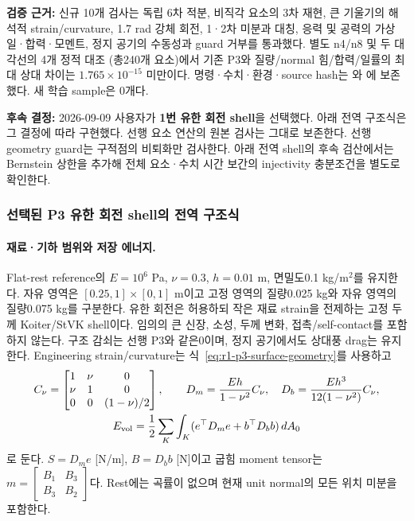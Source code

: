 \documentclass[10pt]{article}
\begin{document}
\textbf{검증 근거:} 신규 10개 검사는 독립 6차 적분, 비직각 요소의 3차 재현,
큰 기울기의 해석적 strain/curvature, 1.7 rad 강체 회전, 1·2차 미분과 대칭,
응력 및 공력의 가상 일·합력·모멘트, 정지 공기의 수동성과 guard 거부를 통과했다.
별도 n4/n8 및 두 대각선의 4개 정적 대조 (총240개 요소)에서 기존 P3와
질량/normal 힘/합력/일률의 최대 상대 차이는 \(1.765\times10^{-15}\) 미만이다.
명령·수치·환경·source hash는
와
에 보존했다. 새 학습 sample은 0개다.

\textbf{후속 결정:} 2026-09-09 사용자가 \textbf{1번 유한 회전 shell}을 선택했다.
아래 전역 구조식은 그 결정에 따라 구현했다. 선행 요소 연산의 원본 검사는 그대로 보존한다.
선행 geometry guard는 구적점의 비퇴화만 검사한다. 아래 전역 shell의 후속 검산에서는
Bernstein 상한을 추가해 전체 요소·수치 시간 보간의 injectivity 충분조건을 별도로 확인한다.

\subsubsection{선택된 P3 유한 회전 shell의 전역 구조식}
\label{sec:r1-p3-shell-equations}

\paragraph{재료·기하 범위와 저장 에너지.}
Flat-rest reference의 \(E=10^6\) Pa, \(\nu=0.3\), \(h=0.01\) m,
면밀도0.1 kg/m$^2$를 유지한다. 자유 영역은 \([0.25,1]\times[0,1]\) m이고
고정 영역의 질량0.025 kg와 자유 영역의 질량0.075 kg를 구분한다.
유한 회전은 허용하되 작은 재료 strain을 전제하는 고정 두께 Koiter/StVK shell이다.
임의의 큰 신장, 소성, 두께 변화, 접촉/self-contact를 포함하지 않는다.
구조 감쇠는 선행 P3와 같은0이며, 정지 공기에서도 상대풍 drag는 유지한다.
Engineering strain/curvature는 식~\eqref{eq:r1-p3-surface-geometry}를 사용하고
\begin{equation}
 \begin{gathered}
 C_\nu=\begin{bmatrix}1&\nu&0\\\nu&1&0\\0&0&(1-\nu)/2\end{bmatrix},\qquad
 D_m=\frac{Eh}{1-\nu^2}C_\nu,\quad
 D_b=\frac{Eh^3}{12(1-\nu^2)}C_\nu,\\
 E_{\rm vol}=\frac12\sum_K\int_K(e^\top D_m e+b^\top D_b b)\,dA_0
 \end{gathered}
 \label{eq:r1-p3-shell-volume}
\end{equation}
로 둔다. \(S=D_me\) [N/m], \(B=D_bb\) [N]이고 굽힘 moment tensor는
\(m=\left[\begin{smallmatrix}B_1&B_3\\B_3&B_2\end{smallmatrix}\right]\)다.
Rest에는 곡률이 없으며 현재 unit normal의 모든 위치 미분을 포함한다.
\end{document}
